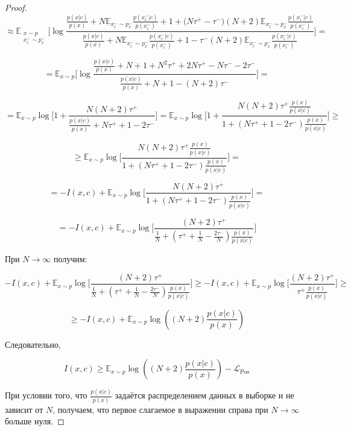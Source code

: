 \documentclass[a4paper, 14pt]{article}
\begin{document}
\begin{proof}
\[\approx \mathbb{E}_{\substack{x \sim p \\ x_i^- \sim p_x^-}} \bigg[\log \frac{\frac{p(x|c)}{p(x)} + N\mathbb{E}_{x_i^- \sim p_x^-}\frac{p(x_i^-|c)}{p(x_i^-)} + 1 + \big(N \tau^+ - \tau^-\big)(N + 2)\mathbb{E}_{x_i^- \sim p_x^-}\frac{p(x_i^-|c)}{p(x_i^-)}}{\frac{p(x|c)}{p(x)} + N\mathbb{E}_{x_i^- \sim p_x^-}\frac{p(x_i^-|c)}{p(x_i^-)} + 1 - \tau^-(N + 2)\mathbb{E}_{x_i^- \sim p_x^-}\frac{p(x_i^-|c)}{p(x_i^-)}}\bigg] =\]

\[= \mathbb{E}_{x \sim p}\bigg[\log \frac{\frac{p(x|c)}{p(x)} + N + 1 + N^2\tau^+ + 2N\tau^+ - N\tau^- - 2\tau^-}{\frac{p(x|c)}{p(x)} + N + 1 - (N + 2)\tau^-}\bigg] =\]

\[= \mathbb{E}_{x \sim p}\log \bigg[1 + \frac{N(N + 2)\tau^+}{\frac{p(x|c)}{p(x)} + N\tau^+ + 1 - 2\tau^-}\bigg] = \mathbb{E}_{x \sim p}\log \bigg[1 + \frac{N(N + 2)\tau^+\frac{p(x)}{p(x|c)}}{1 + \left(N\tau^+ + 1 - 2\tau^-\right)\frac{p(x)}{p(x|c)}}\bigg] \geq\]

\[\geq \mathbb{E}_{x \sim p}\log \bigg[\frac{N(N + 2)\tau^+\frac{p(x)}{p(x|c)}}{1 + \left(N\tau^+ + 1 - 2\tau^-\right)\frac{p(x)}{p(x|c)}}\bigg] =\]

\[= - I(x, c) + \mathbb{E}_{x \sim p}\log \bigg[\frac{N(N + 2)\tau^+}{1 + \left(N\tau^+ + 1 - 2\tau^-\right)\frac{p(x)}{p(x|c)}}\bigg] =\]

\[= - I(x, c) + \mathbb{E}_{x \sim p}\log \bigg[\frac{(N + 2)\tau^+}{\frac{1}{N} + \left(\tau^+ + \frac{1}{N} - \frac{2\tau^-}{N}\right)\frac{p(x)}{p(x|c)}}\bigg]\]

При $N \to \infty$ получим:

\[- I(x, c) + \mathbb{E}_{x \sim p}\log \bigg[\frac{(N + 2)\tau^+}{\frac{1}{N} + \left(\tau^+ + \frac{1}{N} - \frac{2\tau^-}{N}\right)\frac{p(x)}{p(x|c)}}\bigg] \geq - I(x, c) + \mathbb{E}_{x \sim p}\log \bigg[\frac{(N + 2)\tau^+}{\tau^+\frac{p(x)}{p(x|c)}}\bigg] \geq\]

\[\geq - I(x, c) + \mathbb{E}_{x \sim p}\log\left((N + 2)\frac{p(x|c)}{p(x)}\right)\]

Следовательно,

\[I(x, c) \geq \mathbb{E}_{x \sim p}\log\left((N + 2)\frac{p(x|c)}{p(x)}\right) - \mathcal{L}_{\text{Pos}}\]

При условии того, что $\frac{p(x|c)}{p(x)}$ задаётся распределением данных в выборке и не зависит от $N$, получаем, что первое слагаемое в выражении справа при $N \to \infty$ больше нуля.

\end{proof}
\end{document}
